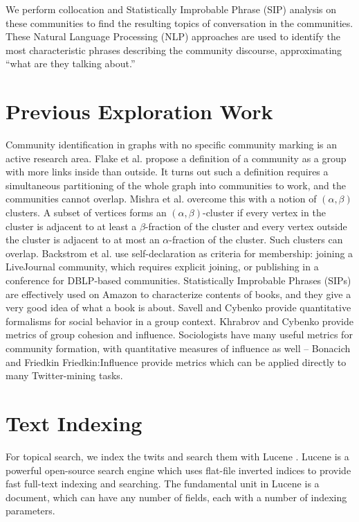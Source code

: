 \documentclass[10pt,oneside]{memoir}
\begin{document}
We perform collocation and Statistically Improbable Phrase (SIP)
analysis on these communities to find the resulting topics of
conversation in the communities. These Natural Language Processing
(NLP) approaches are used to identify the most characteristic
phrases describing the community discourse, approximating
``what are they talking about.''


\pagebreak \section{Previous Exploration Work}
\label{previousexplorationwork}

Community identification in graphs with no specific community marking is an active research area. Flake et al. \cite{DBLP:conf/kdd/FlakeLG00} propose a definition of a community as a group with more links inside than outside. It turns out such a definition requires a simultaneous partitioning of the whole graph into communities to work, and the communities cannot overlap. Mishra et al. \cite{DBLP:conf/waw/MishraSST07} overcome this with a notion of $(\alpha,\beta)$ clusters. A subset of vertices forms an $(\alpha,\beta)$-cluster if every vertex in the cluster is adjacent to at least a $\beta$-fraction of the cluster and every vertex outside the cluster is adjacent to at most an $\alpha$-fraction of the cluster. Such clusters can overlap. Backstrom et al. \cite{DBLP:conf/kdd/BackstromHKL06} use self-declaration as criteria for membership: joining a LiveJournal community, which requires explicit joining, or publishing in a conference for DBLP-based communities. Statistically Improbable Phrases (SIPs) are effectively used on Amazon to characterize contents of books, and they give a very good idea of what a book is about. Savell and Cybenko \cite{Savell:2008:Intelligence} provide quantitative formalisms for social behavior in a group context. Khrabrov and Cybenko \cite{Khrabrov:2010:Dynamic} provide metrics of group cohesion and influence. Sociologists have many useful metrics for community formation, with quantitative measures of influence as well -- Bonacich \cite{Bonacich:2001:Coalitions} and Friedkin {Friedkin:Influence} provide metrics which can be applied directly to many Twitter-mining tasks.


\section{Text Indexing}
\label{textindexing}

For topical search, we index the twits and search them with Lucene
\cite{code:lucene}. Lucene is a powerful open-source search engine which
uses flat-file inverted indices to provide fast full-text indexing
and searching. The fundamental unit in Lucene is a document, which
can have any number of fields, each with a number of indexing
parameters.
\end{document}
